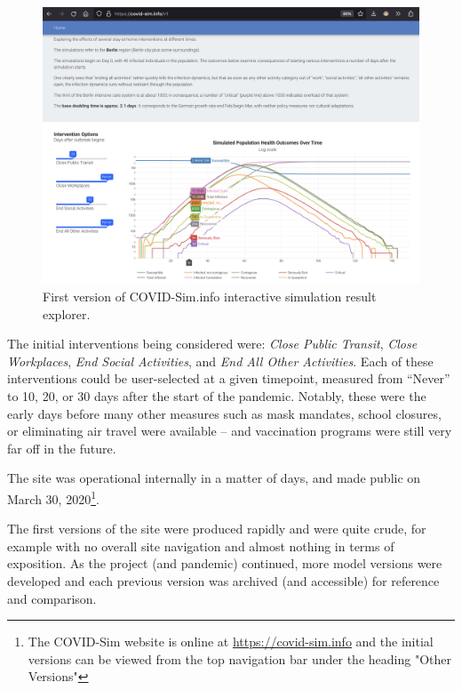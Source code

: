 \begin{figure}
  \centering
	\begin{minipage}{0.8\textwidth}
    \includegraphics[width=\textwidth]{chapters/21-covid-sim/images/covid-v1.png}
  \caption{First version of COVID-Sim.info interactive simulation result explorer.}
  \label{fig:covid-v1}
	\end{minipage}
\end{figure}

The initial interventions being considered were: \emph{Close Public Transit}, \emph{Close Workplaces}, \emph{End Social Activities}, and \emph{End All Other Activities}. Each of these interventions could be user-selected at a given timepoint, measured from ``Never'' to 10, 20, or 30 days after the start of the pandemic. Notably, these were the early days before many other measures such as mask mandates, school closures, or eliminating air travel were available -- and vaccination programs were still very far off in the future.

The site was operational internally in a matter of days, and made public on March 30, 2020\footnote{The COVID-Sim website is online at \url{https://covid-sim.info} and the initial versions can be viewed from the top navigation bar under the heading "Other Versions"}.

The first versions of the site were produced rapidly and were quite crude, for example with no overall site navigation and almost nothing in terms of exposition. As the project (and pandemic) continued, more model versions were developed and each previous version was archived (and accessible) for reference and comparison.

